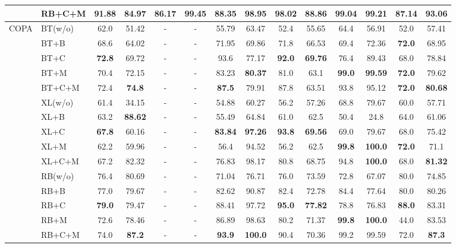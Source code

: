 \documentclass{ecai}  %
\begin{document}
\begin{multicols}{2}
\begin{center}
\begin{table}[H]
\begin{tabularx}{\textwidth}{ll|c|ccccccccccc}
 						       \\ 
		   & RB+C+M& 91.88&84.97&\bf{86.17}&\bf{99.45}&88.35&\bf{98.95}&98.02&88.86&99.04&99.21&87.14&\bf{93.06}
 					     	       \\ 

	\midrule
		\multirow{15}{*}{COPA} 

 		    
                &  BT(w/o) &62.0&51.42&-&-&55.79&63.47&52.4&55.65&64.4&56.91&52.0&57.41
                						\\ 
		&  BT+B & 68.6&64.02&-&-&71.95&69.86&71.8&66.53&69.4&72.36&\bf{72.0}&68.95
 						        \\ 
		&  BT+C & \bf{72.8}&69.72&-&-&93.6&77.17&\bf{92.0}&\bf{69.76}&76.4&89.43&68.0&78.84
 						        \\ 
		   & BT+M &70.4&72.15&-&-&83.23&\bf{80.37}&81.0&63.1&\bf{99.0}&\bf{99.59}&\bf{72.0}&79.62
 						       \\ 
		   & BT+C+M&72.4&\bf{74.8}&-&-&\bf{87.5}&79.91&87.8&63.51&93.8&95.12&\bf{72.0}&\bf{80.68}
		
 					     	       \\ \cmidrule{2-14}
						          
			&  XL(w/o) &61.4&34.15&-&-&54.88&60.27&56.2&57.26&68.8&79.67&60.0&57.71
                						\\ 
		&  XL+B & 63.2&\bf{88.62}&-&-&55.49&64.84&61.0&62.5&50.4&24.8&64.0&61.06
 						        \\ 
		&  XL+C & \bf{67.8}&60.16&-&-&\bf{83.84}&\bf{97.26}&\bf{93.8}&\bf{69.56}&69.0&79.67&68.0&75.42
 						        \\ 
		   & XL+M & 62.2&59.96&-&-&56.4&94.52&56.2&62.5&\bf{99.8}&\bf{100.0}&\bf{72.0}&71.1
 						       \\ 
		   & XL+C+M&67.2&82.32&-&-&76.83&98.17&80.8&68.75&94.8&\bf{100.0}&68.0&\bf{81.32}
 					     	       \\ \cmidrule{2-14}
	&  RB(w/o) & 76.4&80.69&-&-&71.04&76.71&76.0&73.59&72.8&67.07&80.0&74.85
                						\\ 
		&  RB+B & 77.0&79.67&-&-&82.62&90.87&82.4&72.78&84.4&77.64&80.0&80.26
 						        \\ 
		&  RB+C & \bf{79.0}&79.47&-&-&88.41&97.72&\bf{95.0}&\bf{77.82}&78.8&76.83&\bf{88.0}&83.31
 						        \\ 
		   & RB+M &72.6&78.46&-&-&86.89&98.63&80.2&71.37&\bf{99.8}&\bf{100.0}&44.0&83.53
 						       \\ 
		   & RB+C+M& 74.0&\bf{87.2}&-&-&\bf{93.9}&\bf{100.0}&90.4&70.36&99.2&99.59&72.0&\bf{87.3}
 					     	       \\ 



\end{tabularx}
\end{table}
\end{center}
\end{multicols}
\end{document}
